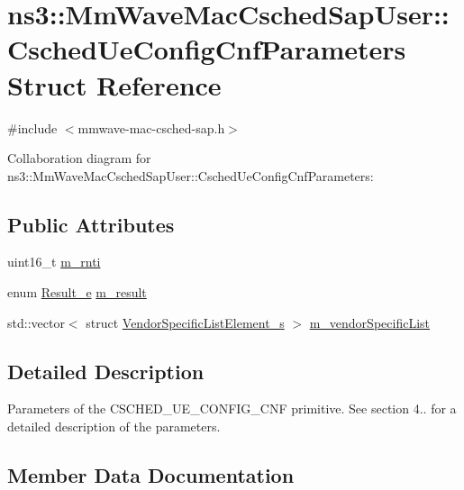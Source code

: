 \hypertarget{structns3_1_1MmWaveMacCschedSapUser_1_1CschedUeConfigCnfParameters}{}\section{ns3\+:\+:Mm\+Wave\+Mac\+Csched\+Sap\+User\+:\+:Csched\+Ue\+Config\+Cnf\+Parameters Struct Reference}
\label{structns3_1_1MmWaveMacCschedSapUser_1_1CschedUeConfigCnfParameters}


{\ttfamily \#include $<$mmwave-\/mac-\/csched-\/sap.\+h$>$}



Collaboration diagram for ns3\+:\+:Mm\+Wave\+Mac\+Csched\+Sap\+User\+:\+:Csched\+Ue\+Config\+Cnf\+Parameters\+:
\subsection*{Public Attributes}
\begin{DoxyCompactItemize}
\item 
uint16\+\_\+t \hyperlink{structns3_1_1MmWaveMacCschedSapUser_1_1CschedUeConfigCnfParameters_a7c7eeb5c84a52140c8d0a322b8e5ffbc}{m\+\_\+rnti}
\item 
enum \hyperlink{namespacens3_a7acf2b7f9e0781dfe43a6bc54d6ecd07}{Result\+\_\+e} \hyperlink{structns3_1_1MmWaveMacCschedSapUser_1_1CschedUeConfigCnfParameters_a7803ea48afb22e35bf82c66cfcc0ae8b}{m\+\_\+result}
\item 
std\+::vector$<$ struct \hyperlink{structns3_1_1VendorSpecificListElement__s}{Vendor\+Specific\+List\+Element\+\_\+s} $>$ \hyperlink{structns3_1_1MmWaveMacCschedSapUser_1_1CschedUeConfigCnfParameters_a1c0619edf45e2f692a5ae4ffbf8084b5}{m\+\_\+vendor\+Specific\+List}
\end{DoxyCompactItemize}


\subsection{Detailed Description}
Parameters of the C\+S\+C\+H\+E\+D\+\_\+\+U\+E\+\_\+\+C\+O\+N\+F\+I\+G\+\_\+\+C\+NF primitive. See section 4.. for a detailed description of the parameters. 

\subsection{Member Data Documentation}
